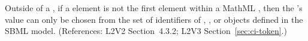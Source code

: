 Outside of a \FunctionDefinition, if a  element is not
the first element within a MathML , then the
's value can only be chosen from the set of identifiers
of \Species, \Compartment, \Parameter or \Reaction objects defined
in the SBML model.  (References: L2V2 Section~4.3.2; L2V3
Section~\ref{sec:ci-token}.)
